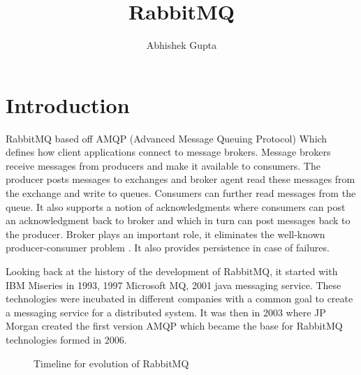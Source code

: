 \documentclass[9pt,twocolumn,twoside]{styles/osajnl}
\title{RabbitMQ}
\author[1,*]{Abhishek Gupta}
\affil[1]{School of Informatics and Computing, Bloomington, IN 47408, U.S.A.}
\affil[*]{Corresponding authors: abhigupt@iu.edu}
\begin{document}
\maketitle

\section{Introduction}
RabbitMQ \cite{www-rabbitmq-pivotal} based off AMQP (Advanced Message Queuing
Protocol\cite{vinoski2006advanced}) Which defines how client applications
connect to message brokers. Message brokers receive messages from producers and
make it available to consumers. The producer posts messages to exchanges and
broker agent read these messages from the exchange and write to queues.
Consumers can further read messages from the queue. It also supports a notion of
acknowledgments where consumers can post an acknowledgment back to broker and
which in turn can post messages back to the producer. Broker plays an important
role, it eliminates the well-known producer-consumer problem
\cite{www-producer-consumer-wiki}. It also provides persistence in case of
failures.

Looking back at the history \cite{videla2012rabbitmq} of the development of
RabbitMQ, it started with IBM Miseries in 1993, 1997 Microsoft MQ, 2001 java
messaging service. These technologies were incubated in different companies with
a common goal to create a messaging service for a distributed system. It was
then in 2003 where JP Morgan created the first version AMQP which became the
base for RabbitMQ technologies formed in 2006.

\begin{figure}[htbp]
\centering
{}
\caption{Timeline for evolution of RabbitMQ \cite{videla2012rabbitmq}}
\label{fig:false-color}
\end{figure}
\end{document}
